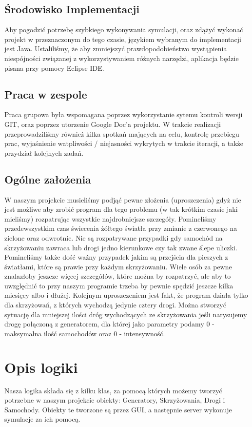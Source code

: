 \documentclass{article}
\begin{document}
\subsection{Środowisko Implementacji}
    Aby pogodzić potrzebę szybkiego wykonywania symulacji, oraz zdążyć wykonać projekt w przeznaczonym do tego czasie, językiem wybranym do implementacji jest Java. Ustaliliśmy, że aby zmniejszyć prawdopodobieństwo wystąpienia niespójności związanej z wykorzystywaniem różnych narzędzi, aplikacja będzie pisana przy pomocy Eclipse IDE. 

\subsection{Praca w zespole}
    Praca grupowa była wspomagana poprzez wykorzystanie sytemu kontroli wersji GIT, oraz poprzez utorzenie Google Doc'a projektu. W trakcie realizacji przeprowadziliśmy również kilka spotkań mających na celu, kontrolę przebiegu prac, wyjaśnienie watpliwości / niejasności wykrytych w trakcie iteracji, a także przydział kolejnych zadań.

\subsection{Ogólne założenia}
    W naszym projekcie musieliśmy podjąć pewne złożenia (uproszczenia) gdyż nie jest możliwe aby zrobić program dla tego problemu (w tak krótkim czasie jaki mieliśmy) rozpatrując wszystkie najdrobniejsze szczegóły. Pomineliśmy przedewszystkim czas świecenia żółtego światła przy zmianie z czerwonego na zielone oraz odwrotnie. Nie są rozpatrywane przypadki gdy samochód na skrzyżowaniu zawraca lub drogi jedno kierunkowe czy tak zwane ślepe uliczki. Pomineliśmy także dość ważny przypadek jakim są przejścia dla pieszych z światłami, które są prawie przy każdym skrzyżowaniu. Wiele osób za pewne znalazłoby jeszcze więcej szczegółów, które można by rozpatrzyć, ale aby to uwzględnić to przy naszym programie trzeba by pewnie spędzić jeszcze kilka miesięcy albo i dłużej. Kolejnym uproszczeniem jest fakt, że program działa tylko dla skrzyżowań, z których wychodzą jedynie cztery drogi. Można stworzyć sytuację dla mniejszej ilości dróg wychodzących ze skrzyżowania jeśli narysujemy drogę połączoną z generatorem, dla której jako parametry podamy 0 - maksymalna ilość samochodów oraz 0 - intensywność.

\section{Opis logiki}
    Nasza logika składa się z kilku klas, za pomocą których możemy tworzyć potrzebne w naszym projekcie obiekty: Generatory, Skrzyżowania, Drogi i Samochody. Obiekty te tworzone są przez GUI, a następnie server wykonuje symulacje za ich pomocą.
\end{document}
